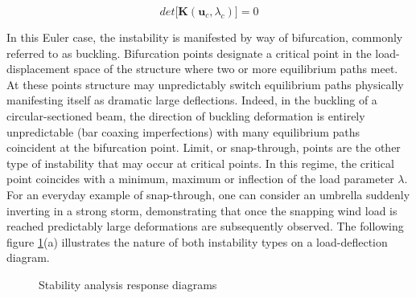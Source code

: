  \begin{equation} 
 det\big[\mathbf{K}(\mathbf{u}_c,\lambda_c)\big] = 0
 \label{eqstab1}
 \end{equation}
 
 In this Euler case, the instability is manifested by way of bifurcation, commonly referred to as buckling. Bifurcation points designate a critical point in the load-displacement space of the structure where two or more equilibrium paths meet. At these points structure may unpredictably switch equilibrium paths physically manifesting itself as dramatic large deflections. Indeed, in the buckling of a circular-sectioned beam, the direction of buckling deformation is entirely unpredictable (bar coaxing imperfections) with many equilibrium paths coincident at the bifurcation point. Limit, or snap-through, points are the other type of instability that may occur at critical points. In this regime, the critical point coincides with a minimum, maximum or inflection of the load parameter $\lambda$. For an everyday example of snap-through, one can consider an umbrella suddenly inverting in a strong storm, demonstrating that once the snapping wind load is reached predictably large deformations are subsequently observed. The following figure \ref{stab1}(a) illustrates the nature of both instability types on a load-deflection diagram.

\begin{figure}[H]
	\caption{\label{stab1}Stability analysis response diagrams \cite{FelippaStabilityBasics2016}}
\end{figure}

